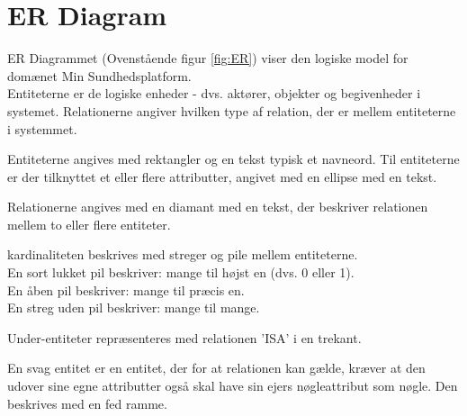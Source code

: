 \section{ER Diagram}
ER Diagrammet (Ovenstående figur \ref{fig:ER}) viser den logiske model for domænet Min Sundhedsplatform. \\
Entiteterne er de logiske enheder - dvs. aktører, objekter og begivenheder i systemet. 
Relationerne angiver hvilken type af relation, der er mellem entiteterne i systemmet.

Entiteterne angives med rektangler og en tekst typisk et navneord. Til entiteterne er der tilknyttet et eller flere attributter, angivet med en ellipse med en tekst.

Relationerne angives med en diamant med en  tekst, der beskriver relationen mellem to eller flere entiteter.

kardinaliteten beskrives med streger og pile mellem entiteterne. \\ 
En sort lukket pil beskriver: mange til højst en (dvs. 0 eller 1).\\
En åben pil beskriver: mange til præcis en.\\
En streg uden pil beskriver: mange til mange.

Under-entiteter repræsenteres med relationen 'ISA' i en trekant.

En svag entitet er en entitet, der for at relationen kan gælde, kræver at den udover sine egne attributter også skal have sin ejers nøgleattribut som nøgle. Den beskrives med en fed ramme.

